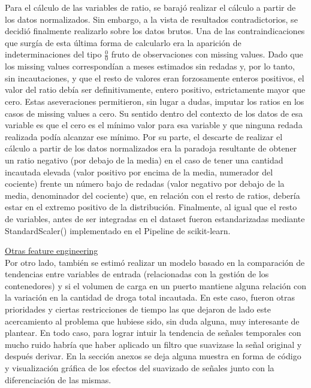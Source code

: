 \documentclass[12pt]{article}
\begin{document}
		Para el cálculo de las variables de ratio, se barajó realizar el cálculo a partir de los datos normalizados. Sin embargo, a la vista de resultados contradictorios, se decidió finalmente realizarlo sobre los datos brutos. Una de las contraindicaciones que surgía de esta última forma de calcularlo era la aparición de indeterminaciones del tipo $ \frac{0}{0}$ fruto de observaciones con missing values. Dado que los missing values correspondían a meses estimados sin redadas y, por lo tanto, sin incautaciones, y que el resto de valores eran forzosamente enteros positivos, el valor del ratio debía ser definitivamente, entero positivo, estrictamente mayor que cero. Estas aseveraciones permitieron, sin lugar a dudas, imputar los ratios en los casos de missing values a cero. Su sentido dentro del contexto de los datos de esa variable es que el cero es el mínimo valor para esa variable y que ninguna redada realizada podía alcanzar ese mínimo. Por su parte, el descarte de realizar el cálculo a partir de los datos normalizados era la paradoja resultante de obtener un ratio negativo (por debajo de la media) en el caso de tener una cantidad incautada elevada (valor positivo por encima de la media, numerador del cociente) frente un número bajo de redadas (valor negativo por debajo de la media, denominador del cociente) que, en relación con el resto de ratios, debería estar en el extremo positivo de la distribución. Finalmente, al igual que el resto de variables, antes de ser integradas en el dataset fueron estandarizadas mediante StandardScaler() implementado en el Pipeline de scikit-learn.
		
		
		\underline{Otras feature engineering}\\
		Por otro lado, también se estimó realizar un modelo basado en la comparación de tendencias entre variables de entrada (relacionadas con la gestión de los contenedores) y si el volumen de carga en un puerto mantiene alguna relación con la variación en la cantidad de droga total incautada. En este caso, fueron otras prioridades y ciertas restricciones de tiempo las que dejaron de lado este acercamiento al problema que hubiese sido, sin duda alguna, muy interesante de plantear. En todo caso, para lograr intuir la tendencia de señales temporales con mucho ruido habría que haber aplicado un filtro que suavizase la señal original y después derivar. En la sección anexos se deja alguna muestra en forma de código y visualización gráfica de los efectos del suavizado de señales junto con la diferenciación de las mismas.
		
\end{document}
